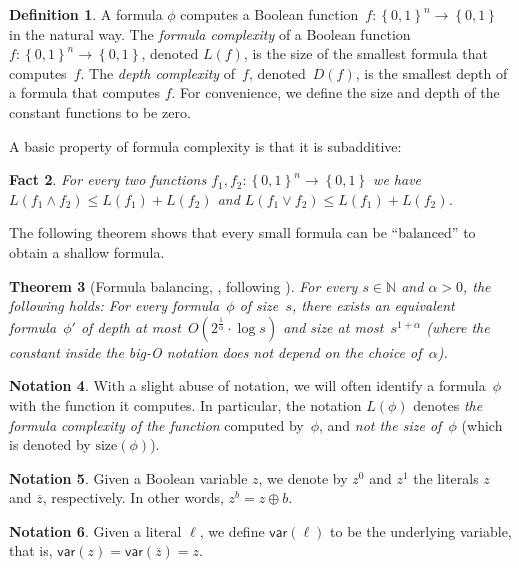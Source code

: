 \documentclass[11pt]{article}
\numberwithin{equation}{section}
\newtheorem{theorem}{Theorem}[section]
\newtheorem{fact}[theorem]{Fact}
\theoremstyle{definition}
\newtheorem{definition}[theorem]{Definition}
\theoremstyle{plain}
\newcommand{\N}{\mathbb N}
\theoremstyle{definition}\newtheorem{notation}[theorem]{Notation}\theoremstyle{plain}
\renewcommand{\N}{\mathbb{N}}
\newcommand{\B}{\left\{ 0,1 \right \}}
\newcommand{\s}{\mathrm{size}}
\newcommand{\var}{\mathsf{var}}
\theoremstyle{definition}
\theoremstyle{plain}
\begin{document}
\begin{definition}
A formula $\phi$ computes a Boolean function~$f\colon\B^{n}\to\B$
in the natural way. The \emph{formula complexity} of a Boolean function~$f\colon\B^{n}\to\B$,
denoted $L(f)$, is the size of the smallest formula that computes~$f$.
The \emph{depth complexity} of~$f$, denoted~$D(f)$, is the smallest
depth of a formula that computes $f$. For convenience, we define
the size and depth of the constant functions to be zero. 
\end{definition}

A basic property of formula complexity is that it is subadditive: 
\begin{fact}
\label{fact:subadditivity}For every two functions $f_{1},f_{2}\colon\B^{n}\to\B$
we have $L(f_{1}\wedge f_{2})\le L(f_{1})+L(f_{2})$ and $L(f_{1}\vee f_{2})\le L(f_{1})+L(f_{2})$. 
\end{fact}

The following theorem shows that every small formula can be ``balanced''
to obtain a shallow formula. 
\begin{theorem}[Formula balancing, \cite{BB94}, following \cite{S71,B74}]
\label{thm:size-depth-tradeoff}For every $s \in \N$ and $\alpha>0$, the following
holds: For every formula~$\phi$ of size~$s$, there exists an equivalent
formula~$\phi'$ of depth at most~$O(2^{\frac{1}{\alpha}}\cdot\log s)$
and size at most~$s^{1+\alpha}$ (where the constant inside the big-O
notation does not depend on the choice of~$\alpha$).
\end{theorem}

\begin{notation}
With a slight abuse of notation, we will often identify a formula~$\phi$
with the function it computes. In particular, the notation $L(\phi)$
denotes \emph{the formula complexity of the function} computed by~$\phi$,
and \emph{not the size of~$\phi$} (which is denoted by $\s(\phi)$). 
\end{notation}

\begin{notation}
Given a Boolean variable $z$, we denote by $z^{0}$ and $z^{1}$
the literals $z$ and $\overline{z}$, respectively. In other words,
$z^{b}=z\oplus b$. 
\end{notation}

\begin{notation}
Given a literal $\ell$, we define $\var(\ell)$ to be the underlying
variable, that is, $\var(z)=\var(\overline{z})=z$. 
\end{notation}
\end{document}
